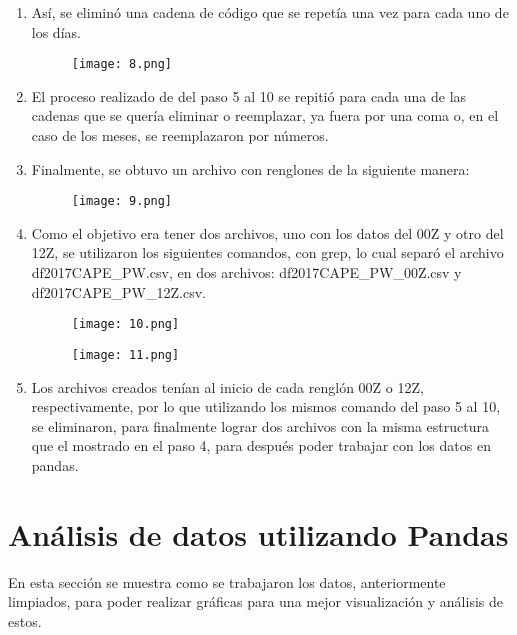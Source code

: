 \documentclass[a4paper]{article}
\begin{document}
\begin{enumerate}
\clearpage
\item Así, se eliminó una cadena de código que se repetía una vez para cada uno de los días. 
\begin{figure}[h!]
  \texttt{[image: 8.png]}
  \centering
  \label{fig:8}
\end{figure}
\item El proceso realizado de del paso 5 al 10 se repitió para cada una de las cadenas que se quería eliminar o reemplazar, ya fuera por una coma o, en el caso de los meses, se reemplazaron por números.
\item Finalmente, se obtuvo un archivo con renglones de la siguiente manera: \begin{figure}[h!]
  \texttt{[image: 9.png]}
  \centering
  \label{fig:9}
\end{figure}
\item Como el objetivo era tener dos archivos, uno con los datos del 00Z y otro del 12Z, se utilizaron los siguientes comandos, con grep, lo cual separó el archivo  df2017CAPE\_PW.csv, en dos archivos: df2017CAPE\_PW\_00Z.csv y df2017CAPE\_PW\_12Z.csv. 
\begin{figure}[h!]
  \texttt{[image: 10.png]}
  \centering
  \label{fig:10}
\end{figure}

\begin{figure}[h!]
  \texttt{[image: 11.png]}
  \centering
  \label{fig:11}
\end{figure}
\item Los archivos creados tenían al inicio de cada renglón 00Z o 12Z, respectivamente, por lo que utilizando los mismos comando del paso 5 al 10, se eliminaron, para finalmente lograr dos archivos con la misma estructura que el mostrado en el paso 4, para después poder trabajar con los datos en pandas. 
\end{enumerate}


\clearpage
\section{Análisis de datos utilizando Pandas}

En esta sección se muestra como se trabajaron los datos, anteriormente limpiados, para poder realizar gráficas para una mejor visualización y análisis de estos.
\end{document}
